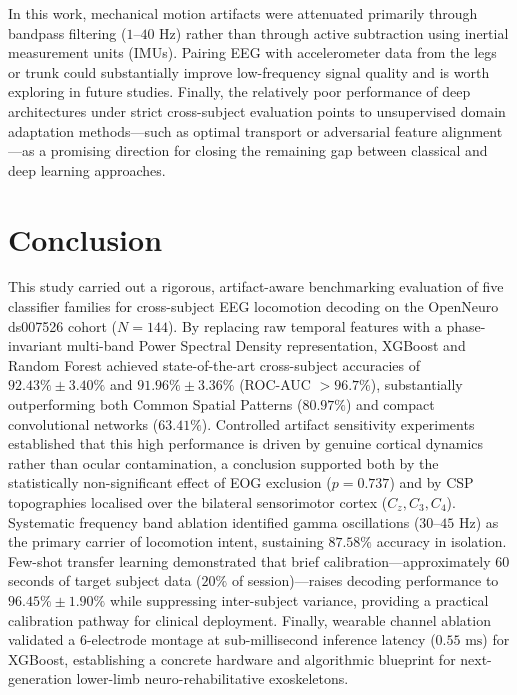 \documentclass[11pt,a4paper]{article}
\begin{document}
In this work, mechanical motion artifacts were attenuated primarily through bandpass filtering ($1\text{--}40\text{ Hz}$) rather than through active subtraction using inertial measurement units (IMUs). Pairing EEG with accelerometer data from the legs or trunk could substantially improve low-frequency signal quality and is worth exploring in future studies. Finally, the relatively poor performance of deep architectures under strict cross-subject evaluation points to unsupervised domain adaptation methods---such as optimal transport or adversarial feature alignment---as a promising direction for closing the remaining gap between classical and deep learning approaches.


\clearpage
\section{Conclusion}
\label{sec:conclusion}
This study carried out a rigorous, artifact-aware benchmarking evaluation of five classifier families for cross-subject EEG locomotion decoding on the OpenNeuro ds007526 cohort ($N=144$). By replacing raw temporal features with a phase-invariant multi-band Power Spectral Density representation, XGBoost and Random Forest achieved state-of-the-art cross-subject accuracies of $92.43\% \pm 3.40\%$ and $91.96\% \pm 3.36\%$ (ROC-AUC $>96.7\%$), substantially outperforming both Common Spatial Patterns ($80.97\%$) and compact convolutional networks ($63.41\%$). Controlled artifact sensitivity experiments established that this high performance is driven by genuine cortical dynamics rather than ocular contamination, a conclusion supported both by the statistically non-significant effect of EOG exclusion ($p = 0.737$) and by CSP topographies localised over the bilateral sensorimotor cortex ($C_z, C_3, C_4$). Systematic frequency band ablation identified gamma oscillations ($30\text{--}45\text{ Hz}$) as the primary carrier of locomotion intent, sustaining $87.58\%$ accuracy in isolation. Few-shot transfer learning demonstrated that brief calibration---approximately 60 seconds of target subject data ($20\%$ of session)---raises decoding performance to $96.45\% \pm 1.90\%$ while suppressing inter-subject variance, providing a practical calibration pathway for clinical deployment. Finally, wearable channel ablation validated a 6-electrode montage at sub-millisecond inference latency ($0.55\text{ ms}$) for XGBoost, establishing a concrete hardware and algorithmic blueprint for next-generation lower-limb neuro-rehabilitative exoskeletons.
\end{document}

